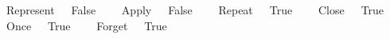 \ \ {\isacharbar}\ {\isachardoublequoteopen}\ {\isacharparenleft}Represent\ \ {\isacharequal}\ False{\isachardoublequoteclose}\isanewline
\ \ {\isacharbar}\ {\isachardoublequoteopen}\ {\isacharparenleft}Apply\ \ {\isacharequal}\ False{\isachardoublequoteclose}\isanewline
\ \ {\isacharbar}\ {\isachardoublequoteopen}\ {\isacharparenleft}Repeat\ \ {\isacharequal}\ True{\isachardoublequoteclose}\isanewline
\ \ {\isacharbar}\ {\isachardoublequoteopen}\ {\isacharparenleft}Close\ \ {\isacharequal}\ True{\isachardoublequoteclose}\isanewline
\ \ {\isacharbar}\ {\isachardoublequoteopen}\ {\isacharparenleft}Once\ \ {\isacharequal}\ True{\isachardoublequoteclose}\isanewline
\ \ {\isacharbar}\ {\isachardoublequoteopen}\ {\isacharparenleft}Forget\ \ {\isacharequal}\ True{\isachardoublequoteclose}
